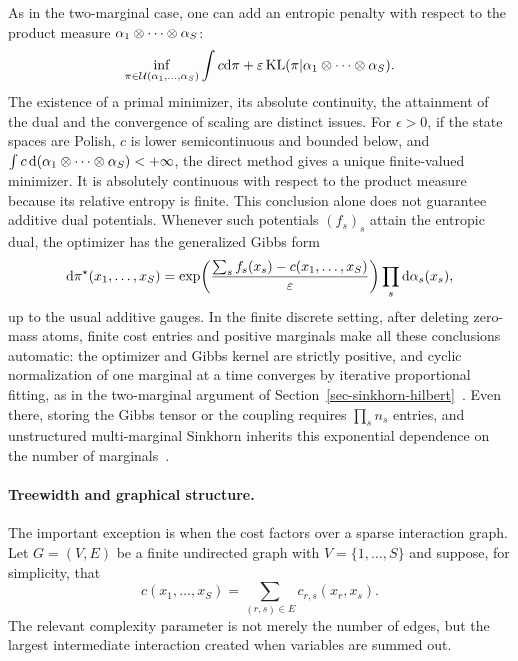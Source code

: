As in the two-marginal case, one can add an entropic penalty with respect to the product measure $\alpha_1\otimes\cdots\otimes\alpha_S$:
\[
	\inf_{\pi\in\mathcal{U}(\alpha_1,\ldots,\alpha_S)}
	\int c\mathrm{d}\pi+\varepsilon\operatorname{KL}(\pi|\alpha_1\otimes\cdots\otimes\alpha_S).
\]
The existence of a primal minimizer, its absolute continuity, the attainment of the dual and the convergence of scaling are distinct issues. For $\epsilon>0$, if the state spaces are Polish, $c$ is lower semicontinuous and bounded below, and $\int c\,\mathrm{d}(\alpha_1\otimes\cdots\otimes\alpha_S)<+\infty$, the direct method gives a unique finite-valued minimizer. It is absolutely continuous with respect to the product measure because its relative entropy is finite. This conclusion alone does not guarantee additive dual potentials. Whenever such potentials $(f_s)_s$ attain the entropic dual, the optimizer has the generalized Gibbs form
\[
	\mathrm{d}\pi^\star(x_1,\ldots,x_S)
	=
	\exp\!\left(\frac{\sum_s f_s(x_s)-c(x_1,\ldots,x_S)}{\varepsilon}\right)
	\prod_s\mathrm{d}\alpha_s(x_s),
\]
up to the usual additive gauges. In the finite discrete setting, after deleting zero-mass atoms, finite cost entries and positive marginals make all these conclusions automatic: the optimizer and Gibbs kernel are strictly positive, and cyclic normalization of one marginal at a time converges by iterative proportional fitting, as in the two-marginal argument of Section~\ref{sec-sinkhorn-hilbert}~\cite{Ruschendorf95,RuschendorfThomsen}. Even there, storing the Gibbs tensor or the coupling requires $\prod_s n_s$ entries, and unstructured multi-marginal Sinkhorn inherits this exponential dependence on the number of marginals~\cite{LinHoCuturiJordan2022MOTComplexity}.

\paragraph{Treewidth and graphical structure.}

The important exception is when the cost factors over a sparse interaction graph. Let $G=(V,E)$ be a finite undirected graph with $V=\{1,\ldots,S\}$ and suppose, for simplicity, that
\begin{equation}\label{eq-multimarginal-graph-cost}
	c(x_1,\ldots,x_S)
	=
	\sum_{(r,s)\in E}c_{r,s}(x_r,x_s).
\end{equation}
The relevant complexity parameter is not merely the number of edges, but the largest intermediate interaction created when variables are summed out.

